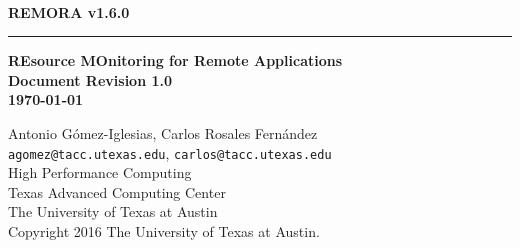 \documentclass[10pt,a4paper]{report}
\begin{document}
\begin{titlepage}
\thispagestyle{empty}	%
\verb+ +
\vspace{1em}
\begin{flushright}
\huge\bf REMORA v1.6.0\\
\rule{\textwidth}{4pt}
\large{\bf REsource MOnitoring for Remote Applications\\
Document Revision 1.0\\
\today}
\end{flushright}

\newpage
\thispagestyle{empty}
\begin{flushleft}
Antonio G\'omez-Iglesias, Carlos Rosales Fern\'andez \\
\verb+agomez@tacc.utexas.edu+, \verb+carlos@tacc.utexas.edu+\\
\vspace{0.5em}
High Performance Computing \\
Texas Advanced Computing Center\\
The University of Texas at Austin\\
\vspace{1cm}
Copyright 2016 The University of Texas at Austin.
\end{flushleft}
\newpage
\end{titlepage}
\end{document}
